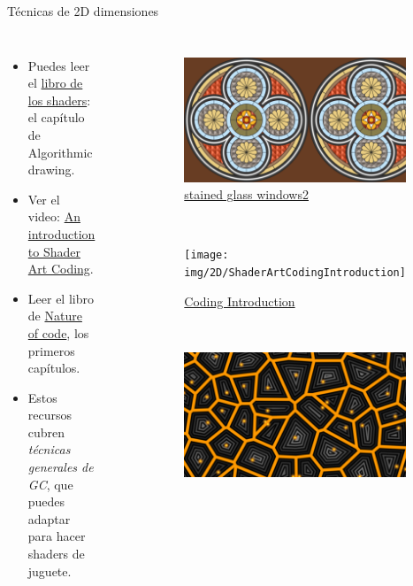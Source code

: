 \begin{frame}{Técnicas de 2D dimensiones}
\begin{columns}
    \begin{itemize}
         \item Puedes leer el \href{https://thebookofshaders.com/05/}{libro de los shaders}: el capítulo de Algorithmic drawing.
         \item Ver el video: \href{https://www.youtube.com/watch?v=f4s1h2YETNY}{An introduction to Shader Art Coding}.
         \item Leer el libro de \href{https://natureofcode.com/}{Nature of code}, los primeros capítulos.
         \item Estos recursos cubren \emph{técnicas generales de GC}, que puedes adaptar para hacer shaders de juguete.
     \end{itemize}
\begin{figure}[htp]
 \centering
 \begin{subfigure}[b]{0.42\textwidth}
   \includegraphics[width=\textwidth]{img/2D/stainedGlassWindows2}
   \caption{\href{https://www.shadertoy.com/view/3cXSz4}{stained glass windows2}}
 \end{subfigure}
~
 \begin{subfigure}[b]{0.42\textwidth}
   \texttt{[image: img/2D/ShaderArtCodingIntroduction]}
   \caption{\href{https://www.shadertoy.com/view/mtyGWy}{Coding Introduction}}
 \end{subfigure}
\\
 \begin{subfigure}[b]{0.42\textwidth}
   \includegraphics[width=\textwidth]{img/2D/VoronoiDistances}

\end{subfigure}
\end{figure}
\end{columns}
\end{frame}

